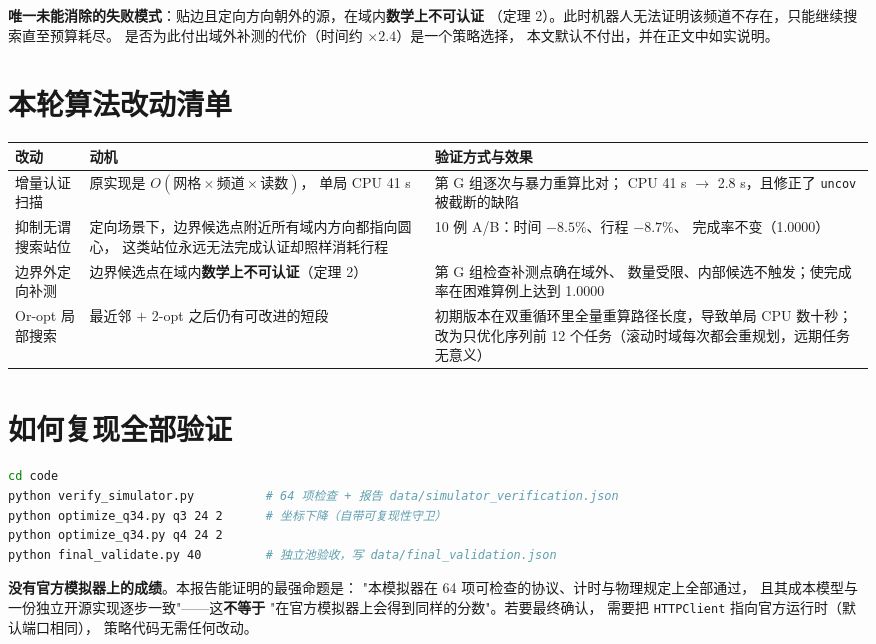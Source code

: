 \textbf{唯一未能消除的失败模式}：贴边且定向方向朝外的源，在域内\textbf{数学上不可认证}
（定理 2）。此时机器人无法证明该频道不存在，只能继续搜索直至预算耗尽。
是否为此付出域外补测的代价（时间约 $\times2.4$）是一个策略选择，
本文默认不付出，并在正文中如实说明。

\section{本轮算法改动清单}

\begin{longtable}{p{3.6cm}p{4.6cm}p{6.6cm}}
\toprule
改动 & 动机 & 验证方式与效果 \\ \midrule
\endhead
增量认证扫描 & 原实现是 $O(\text{网格}\times\text{频道}\times\text{读数})$，
单局 CPU 41 s & 第 G 组逐次与暴力重算比对；
CPU 41 s $\to$ 2.8 s，且修正了 \texttt{uncov} 被截断的缺陷 \\
抑制无谓搜索站位 & 定向场景下，边界候选点附近所有域内方向都指向圆心，
这类站位永远无法完成认证却照样消耗行程 & 10 例 A/B：时间 $-8.5\%$、行程 $-8.7\%$、
完成率不变（1.0000） \\
边界外定向补测 & 边界候选点在域内\textbf{数学上不可认证}（定理 2） & 第 G 组检查补测点确在域外、
数量受限、内部候选不触发；使完成率在困难算例上达到 1.0000 \\
Or-opt 局部搜索 & 最近邻 $+$ 2-opt 之后仍有可改进的短段 &
初期版本在双重循环里全量重算路径长度，导致单局 CPU 数十秒；
改为只优化序列前 12 个任务（滚动时域每次都会重规划，远期任务无意义） \\
\bottomrule
\end{longtable}

\section{如何复现全部验证}

\begin{lstlisting}[language=bash]
cd code
python verify_simulator.py          # 64 项检查 + 报告 data/simulator_verification.json
python optimize_q34.py q3 24 2      # 坐标下降（自带可复现性守卫）
python optimize_q34.py q4 24 2
python final_validate.py 40         # 独立池验收，写 data/final_validation.json
\end{lstlisting}

\begin{warnbox}[title=仍未做到的事]
\textbf{没有官方模拟器上的成绩}。本报告能证明的最强命题是：
"本模拟器在 64 项可检查的协议、计时与物理规定上全部通过，
且其成本模型与一份独立开源实现逐步一致"——这\textbf{不等于}
"在官方模拟器上会得到同样的分数"。若要最终确认，
需要把 \texttt{HTTPClient} 指向官方运行时（默认端口相同），
策略代码无需任何改动。
\end{warnbox}


